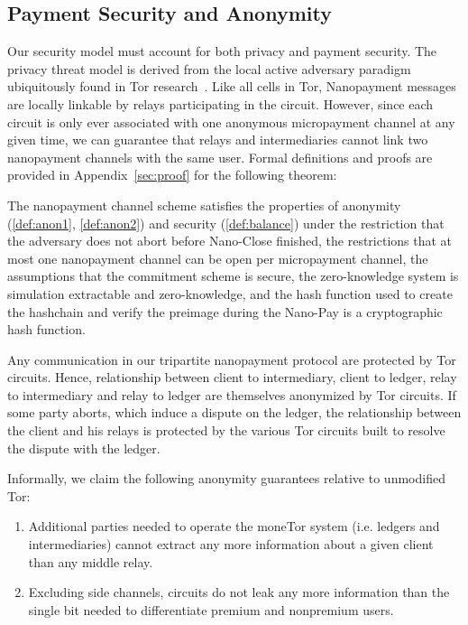 \subsection{Payment Security and Anonymity}
\label{subsec:paysecurity}
Our security model must account for both privacy and payment security. The
privacy threat model is derived from the local active adversary paradigm
ubiquitously found in Tor research~\cite{dingledine2004tor}. Like all cells in
Tor, Nanopayment messages are locally linkable by relays participating in the
circuit. However, since each circuit is only ever associated with one anonymous
micropayment channel at any given time, we can guarantee that relays and
intermediaries cannot link two nanopayment channels with the same user. Formal
definitions and proofs are provided in Appendix~\ref{sec:proof} for the following theorem:

\begin{theorem}
The nanopayment channel scheme satisfies the properties of anonymity (\ref{def:anon1}, \ref{def:anon2})
 and security (\ref{def:balance}) under the restriction that the adversary does not abort before Nano-Close finished, the restrictions that at most one nanopayment channel can be open per micropayment channel, the assumptions that the commitment scheme is secure, the zero-knowledge system is simulation extractable and zero-knowledge, and the hash function used to create the hashchain and verify the preimage during the Nano-Pay is a cryptographic hash function.

\end{theorem}

Any communication in
our tripartite nanopayment protocol are protected by Tor circuits. Hence,
relationship between client to intermediary, client to ledger, relay to
intermediary and relay to ledger are themselves anonymized by Tor circuits. If
some party aborts, which induce a dispute on the ledger, the relationship
between the client and his relays is protected by the various Tor circuits built
to resolve the dispute with the ledger.

Informally, we claim the following anonymity guarantees relative to unmodified Tor:

\begin{enumerate}
\item Additional parties needed to operate the moneTor system (i.e. ledgers and
  intermediaries) cannot extract any more information about a given client than
  any middle relay.
\item Excluding side channels, circuits do not leak any more information than
  the single bit needed to differentiate premium and nonpremium users.
\end{enumerate}

